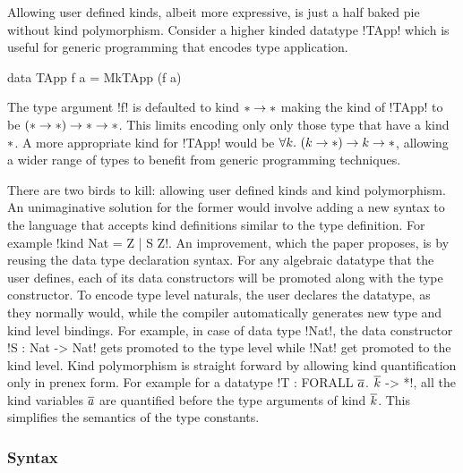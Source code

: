 \documentclass[manuscript,screen,nonacm]{acmart}
\begin{document}
Allowing user defined kinds, albeit more expressive, is just a half baked pie without kind polymorphism. Consider a higher kinded datatype !TApp! which is useful for generic programming that encodes type application.
\begin{code}
  data TApp f a = MkTApp (f a)
\end{code}

The type argument !f! is defaulted to kind $\ast \to \ast$ making the kind of !TApp! to be $(\ast \to \ast) \to \ast \to \ast$. This limits encoding only only those type that have a kind $\ast$. A more appropriate kind for !TApp! would be $\forall k.~(k\to\ast) \to k \to \ast$, allowing a wider range of types to benefit from generic programming techniques.

There are two birds to kill: allowing user defined kinds and kind polymorphism. An unimaginative solution for the former would involve adding a new syntax to the language that accepts kind definitions similar to the type definition. For example !kind Nat = Z | S Z!. An improvement, which the paper proposes, is by reusing the data type declaration syntax. For any algebraic datatype that the user defines, each of its data constructors will be promoted along with the type constructor. To encode type level naturals, the user declares the datatype, as they normally would, while the compiler automatically generates new type and kind level bindings. For example, in case of data type !Nat!, the data constructor !S : Nat -> Nat! gets promoted to the type level while !Nat! get promoted to the kind level. Kind polymorphism is straight forward by allowing kind quantification only in prenex form. For example for a datatype !T : FORALL $\overline{a}$. $\overline{k}$ -> *!, all the kind variables $\overline{a}$ are quantified before the type arguments of kind $\overline{k}$. This simplifies the semantics of the type constants.

\subsubsection{Syntax}
\end{document}
